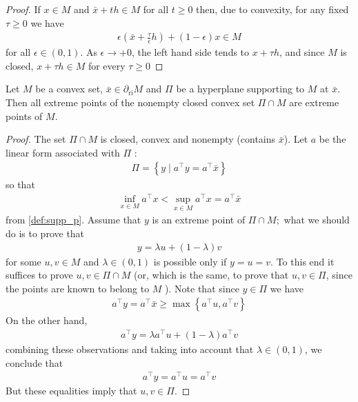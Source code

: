 \documentclass{article}
\begin{document}
\begin{proof}\color{ForestGreen}
If $x \in M$ and $\bar{x}+t h \in M$ for all $t \geq 0$ then, due to convexity, for any fixed $\tau \geq 0$ we have
\begin{align*}
\epsilon\left(\bar{x}+\frac{\tau}{\epsilon} h\right)+(1-\epsilon) x \in M
\end{align*}
for all $\epsilon \in(0,1)$. As $\epsilon \rightarrow+0$, the left hand side tends to $x+\tau h$, and since $M$ is closed, $x+\tau h \in M$ for every $\tau \geq 0$
\end{proof}
\begin{lema}\label{lem:ex_p}
  Let $M$ be a  convex set, $\bar{x}\in \partial_{\mathrm{ri}} M$ and $\Pi$ be a hyperplane supporting to $M$ at $\bar{x}$. Then all extreme points of the nonempty closed convex set $\Pi \cap M$ are extreme points of $M$.
\end{lema}
\begin{proof}\color{ForestGreen}
The set $\Pi \cap M$ is closed, convex and nonempty (contains $\bar{x}$). Let $a$ be the linear form associated with $\Pi$ :
\begin{align*}
\Pi=\left\{y \mid a^{\top} y=a^{\top} \bar{x}\right\}
\end{align*}
so that
\begin{align*}
\inf _{x \in M} a^{\top} x<\sup _{x \in M} a^{\top} x=a^{\top} \bar{x}
\end{align*}
from \cref{def:supp_p}. Assume that $y$ is an extreme point of $\Pi \cap M ;$ what we should do is to prove that
\begin{align*}
y=\lambda u+(1-\lambda) v
\end{align*}
for some $u, v \in M$ and $\lambda \in(0,1)$ is possible only if $y=u=v .$ To this end it suffices to prove $u, v \in \Pi \cap M$ (or, which is the same, to prove that $u, v \in \Pi$, since the points are known to belong to $M$ ). 
Note that since $y \in \Pi$ we have
\begin{align*}
a^{\top} y=a^{\top} \bar{x} \geq \max \left\{a^{\top} u, a^{\top} v\right\}
\end{align*}
On the other hand,
\begin{align*}
a^{\top} y=\lambda a^{\top} u+(1-\lambda) a^{\top} v
\end{align*}
combining these observations and taking into account that $\lambda \in(0,1)$, we conclude that
\begin{align*}
a^{\top} y=a^{\top} u=a^{\top} v
\end{align*}
But these equalities imply that $u, v \in \Pi$.
\end{proof}
\end{document}
